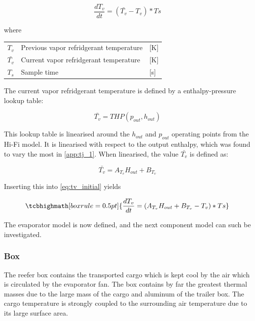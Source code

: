 \begin{equation}\label{eq:tv_initial}
	\frac{dT_{v}}{dt} = (\bar{T_v} - T_v) * Ts
\end{equation}

where\\

\begin{center}
	\begin{tabular}{l p{10cm} l}
		$T_v $       	 & Previous vapor refridgerant temperature                                  & [\si{K}] 						\\
		$\bar{T_v} $     & Current vapor refridgerant temperature                                   & [\si{K}]                  \\
		$T_s$            & Sample time                                    						    & [\si{s}]                  \\
	\end{tabular}
\end{center}

The current vapor refridgerant temperature is defined by a enthalpy-pressure lookup table:

\begin{equation}
	\bar{T_v} = THP(p_{out}, h_{out})
\end{equation}

This lookup table is linearised around the $h_{out}$ and $p_{out}$ operating points from the Hi-Fi model. It is linearised with respect to the output enthalpy, which was found to vary the most in \cref{app:tj_1}. When linearised, the value $\bar{T_v}$ is defined as:

\begin{equation}
	\bar{T_v} = A_{T_v} H_{out} + B_{T_v}
\end{equation}

Inserting this into \cref{eq:tv_initial} yields

\begin{equation} \label{eq:evap_dTv}
	\tcbhighmath[boxrule = 0.5pt]{\frac{dT_v}{dt}   = (A_{T_v} H_{out} + B_{T_v} - T_v) * Ts  }
\end{equation}

The evaporator model is now defined, and the next component model can such be investigated.


\subsubsection{Box} \label{sec:mod_box}
The reefer box contains the transported cargo which is kept cool by the air which is circulated by the evaporator fan. The box contains by far the greatest thermal masses due to the large mass of the cargo and aluminum of the trailer box. The cargo temperature is strongly coupled to the surrounding air temperature due to its large surface area.

